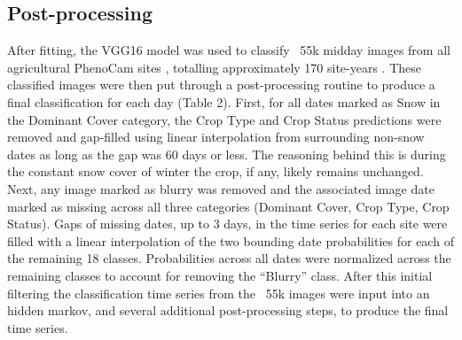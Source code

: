 \documentclass{article}
\begin{document}
\subsection{Post-processing}

After fitting, the VGG16 model was used to classify ~55k midday images from all agricultural PhenoCam sites , totalling approximately 170 site-years \citep{milliman2019-phenocam}. These classified images were then put through a post-processing routine to produce a final classification for each day (Table 2). First, for all dates marked as Snow in the Dominant Cover category, the Crop Type and Crop Status predictions were removed and gap-filled using linear interpolation from surrounding non-snow dates as long as the gap was 60 days or less. The reasoning behind this is during the constant snow cover of winter the crop, if any, likely remains unchanged. Next, any image marked as blurry was removed and the associated image date marked as missing across all three categories (Dominant Cover, Crop Type, Crop Status). Gaps of missing dates, up to 3 days, in the time series for each site were filled with a linear interpolation of the two bounding date probabilities for each of the remaining 18 classes. Probabilities across all dates were normalized across the remaining classes to account for removing the “Blurry” class. After this initial filtering the classification time series from the ~55k images were input into an hidden markov, and several additional post-processing steps, to produce the final time series. 
\end{document}
